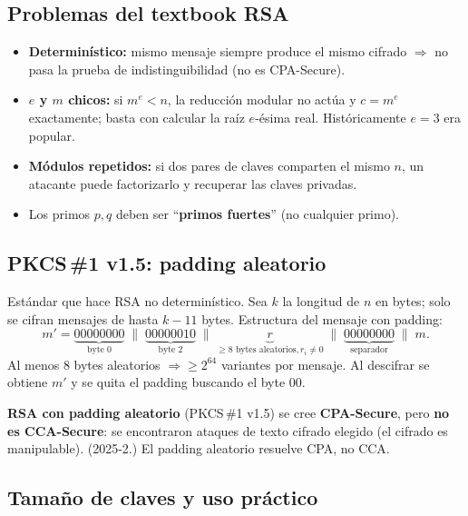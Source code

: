 \documentclass[11pt,a4paper]{article}
\begin{document}
\subsection{Problemas del textbook RSA}

\begin{itemize}[leftmargin=1.4em,nosep]
  \item \textbf{Determinístico:} mismo mensaje siempre produce el mismo cifrado
  $\Rightarrow$ no pasa la prueba de indistinguibilidad (no es CPA-Secure).
  \item \textbf{$e$ y $m$ chicos:} si $m^e < n$, la reducción modular no actúa y
  $c = m^e$ exactamente; basta con calcular la raíz $e$-ésima real. Históricamente
  $e = 3$ era popular.
  \item \textbf{Módulos repetidos:} si dos pares de claves comparten el mismo $n$,
  un atacante puede factorizarlo y recuperar las claves privadas.
  \item Los primos $p, q$ deben ser ``\textbf{primos fuertes}'' (no cualquier primo).
\end{itemize}

\subsection{PKCS\,\#1 v1.5: padding aleatorio}

Estándar que hace RSA no determinístico. Sea $k$ la longitud de $n$ en bytes; solo
se cifran mensajes de hasta $k - 11$ bytes. Estructura del mensaje con padding:
\[
  m' = \underbrace{00000000}_{\text{byte 0}}
       \;\|\; \underbrace{00000010}_{\text{byte 2}}
       \;\|\; \underbrace{r}_{\ge 8 \text{ bytes aleatorios}, r_i \ne 0}
       \;\|\; \underbrace{00000000}_{\text{separador}}
       \;\|\; m.
\]
Al menos 8 bytes aleatorios $\Rightarrow \ge 2^{64}$ variantes por mensaje.
Al descifrar se obtiene $m'$ y se quita el padding buscando el byte $00$.

\begin{examen}
\textbf{RSA con padding aleatorio} (PKCS\,\#1 v1.5) se cree \textbf{CPA-Secure},
pero \textbf{no es CCA-Secure}: se encontraron ataques de texto cifrado elegido
(el cifrado es manipulable). (2025-2.) El padding aleatorio resuelve CPA, no CCA.
\end{examen}

\subsection{Tamaño de claves y uso práctico}
\end{document}
